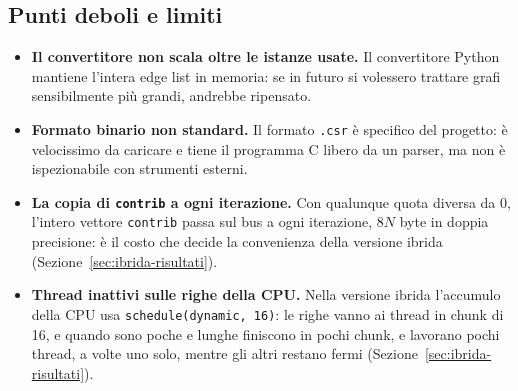 \documentclass[11pt,a4paper]{article}
\begin{document}
\subsection{Punti deboli e limiti}
\label{sec:limiti}
\begin{itemize}
  \item \textbf{Il convertitore non scala oltre le istanze usate.} Il
    convertitore Python mantiene l'intera edge list in memoria: se in futuro
    si volessero trattare grafi sensibilmente più grandi, andrebbe ripensato.
  \item \textbf{Formato binario non standard.} Il formato \texttt{.csr} è
    specifico del progetto: è velocissimo da caricare e tiene il programma C
    libero da un parser, ma non è ispezionabile con strumenti esterni.
  \item \textbf{La copia di \texttt{contrib} a ogni iterazione.} Con
    qualunque quota diversa da 0, l'intero vettore \texttt{contrib} passa sul
    bus a ogni iterazione, $8N$ byte in doppia precisione: è il costo che
    decide la convenienza della versione ibrida
    (Sezione~\ref{sec:ibrida-risultati}).
  \item \textbf{Thread inattivi sulle righe della CPU.} Nella versione ibrida
    l'accumulo della CPU usa \texttt{schedule(dynamic,~16)}: le righe vanno ai
    thread in chunk di 16, e quando sono poche e lunghe finiscono in pochi chunk,
    e lavorano pochi thread, a volte uno solo, mentre gli altri restano fermi
    (Sezione~\ref{sec:ibrida-risultati}).
\end{itemize}
\end{document}
